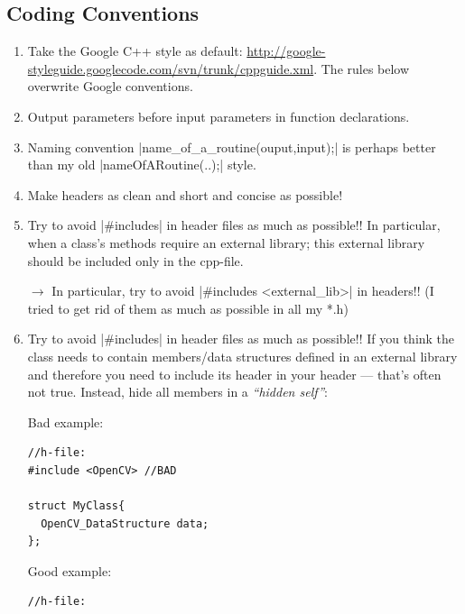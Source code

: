 
\subsection{Coding Conventions}

\begin{enumerate}
\item Take the Google C++ style as default:
  \url{http://google-styleguide.googlecode.com/svn/trunk/cppguide.xml}.
  The rules below overwrite Google conventions.

\item Output parameters before input parameters in function declarations.

\item Naming convention |name_of_a_routine(ouput,input);| is
  perhaps better than my old |nameOfARoutine(..);| style.

\item Make headers as clean and short and concise as possible!

\item Try to avoid |#includes| in header files as much as possible!!
  In particular, when a class's methods require an external library;
  this external library should be included only in the cpp-file.

 $\to$ In particular, try to avoid |#includes <external_lib>| in headers!! (I
 tried to get rid of them as much as possible in all my *.h)

\item Try to avoid |#includes| in header files as much as possible!!
  If
  you think the class needs to contain members/data structures defined
  in an external library and therefore you need to include its header
  in your header --- that's often not true. Instead, hide all members
  in a \emph{``hidden self''}:

Bad example:

\begin{code}
\begin{verbatim}
//h-file:
#include <OpenCV> //BAD

struct MyClass{
  OpenCV_DataStructure data;
};
\end{verbatim}
\end{code}

Good example:

\begin{code}
\begin{verbatim}
//h-file:


\end{verbatim}
\end{code}
\end{enumerate}
